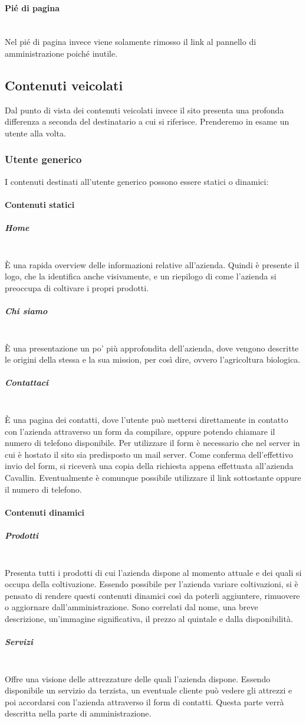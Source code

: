 \paragraph{Pié di pagina}
~\\Nel pié di pagina invece viene solamente rimosso il link al pannello di amministrazione poiché inutile.

\subsection{Contenuti veicolati}
Dal punto di vista dei contenuti veicolati invece il sito presenta una profonda differenza a seconda del destinatario a cui si riferisce. Prenderemo in esame un utente alla volta.
\subsubsection{Utente generico}
I contenuti destinati all'utente generico possono essere statici o dinamici:
\paragraph{Contenuti statici}
\subparagraph{Home}
~\\È una rapida overview delle informazioni relative all'azienda. Quindi è presente il logo, che la identifica anche visivamente, e un riepilogo di come l'azienda si preoccupa di coltivare i propri prodotti.
\subparagraph{Chi siamo}
~\\È una presentazione un po' più approfondita dell'azienda, dove vengono descritte le origini della stessa e la sua mission, per così dire, ovvero l'agricoltura biologica.
\subparagraph{Contattaci}
~\\È una pagina dei contatti, dove l'utente può mettersi direttamente in contatto con l'azienda attraverso un form da compilare, oppure potendo chiamare il numero di telefono disponibile. Per utilizzare il form è necessario che nel server in cui è hostato il sito sia predisposto un mail server. Come conferma dell'effettivo invio del form, si riceverà una copia della richiesta appena effettuata all'azienda Cavallin. Eventualmente è comunque possibile utilizzare il link sottostante oppure il numero di telefono.
\paragraph{Contenuti dinamici}
\subparagraph{Prodotti} 
~\\Presenta tutti i prodotti di cui l'azienda dispone al momento attuale e dei quali si occupa della coltivazione. Essendo possibile per l'azienda variare coltivazioni, si è pensato di rendere questi contenuti dinamici così da poterli aggiuntere, rimuovere o aggiornare dall'amministrazione. Sono correlati dal nome, una breve descrizione, un'immagine significativa, il prezzo al quintale e dalla disponibilità.
\subparagraph{Servizi} 
~\\Offre una visione delle attrezzature delle quali l'azienda dispone. Essendo disponibile un servizio da terzista, un eventuale cliente può vedere gli attrezzi e poi accordarsi con l'azienda attraverso il form di contatti. Questa parte verrà descritta nella parte di amministrazione.


